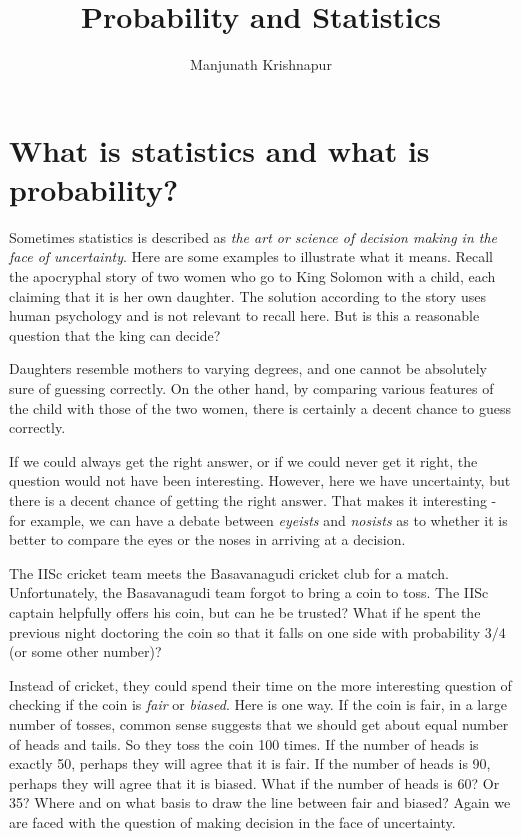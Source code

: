 \documentclass[preprint,  11pt]{amsart}
\begin{document}
\title{Probability and Statistics}
\author{Manjunath Krishnapur}

\maketitle

 \tableofcontents

\newpage

\maketitle


\section{What is statistics and what is probability?}
Sometimes statistics is described as {\em the art or science of decision making in the face of uncertainty}.  Here are some examples to illustrate what it means.
\beg Recall the apocryphal story of two women who go to King Solomon with a child, each claiming that it is her own daughter. The solution according to the story uses human psychology and is not relevant to recall here. But is this a reasonable question that the king can decide?

Daughters resemble mothers to varying degrees, and one cannot be absolutely sure of guessing correctly.
 On the other hand, by comparing various features of the child with those of the two women, there is certainly a decent chance to guess correctly.

  If we could always get the right answer, or if we could never get it right, the question would not have been interesting. However, here we have uncertainty, but there is a decent chance of getting the right answer. That makes it interesting - for example, we can have a debate between {\em eyeists}  and {\em nosists} as to whether it is better to compare the eyes or the noses in arriving at a decision.
\eeg

\beg The IISc cricket team meets the Basavanagudi cricket club for a match. Unfortunately, the Basavanagudi team forgot to bring a coin to toss. The IISc captain helpfully offers his coin, but can he be trusted? What if he spent the previous night doctoring the coin so that it falls on one side with probability $3/4$ (or some other number)?

Instead of cricket, they could spend their time on the more interesting question of checking if the coin is {\em fair} or {\em biased}. Here is one way. If the coin is fair, in a large number of tosses, common sense suggests that we should get about equal number of heads and tails. So they  toss the coin 100 times. If the number of heads is exactly 50, perhaps they will agree that it is fair. If the number of heads is 90, perhaps they will agree that it is biased. What if the number of heads is 60? Or 35? Where and on what basis to draw the line between fair and biased? Again we are faced with the question of making decision in the face of uncertainty.
\eeg
\end{document}
